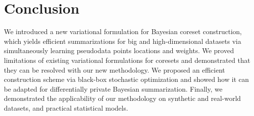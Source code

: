 \section{Conclusion}
We introduced a new variational formulation for Bayesian coreset construction, which yields efficient summarizations for big and high-dimensional datasets via simultaneously learning pseudodata points locations and weights. We proved limitations of existing variational formulations for coresets and demonstrated that they can be resolved with our new methodology. We proposed an efficient construction scheme via black-box stochastic optimization and showed how it can be adapted for differentially private Bayesian summarization. Finally, we demonstrated the applicability of our methodology on synthetic and real-world datasets, and practical statistical models.  

